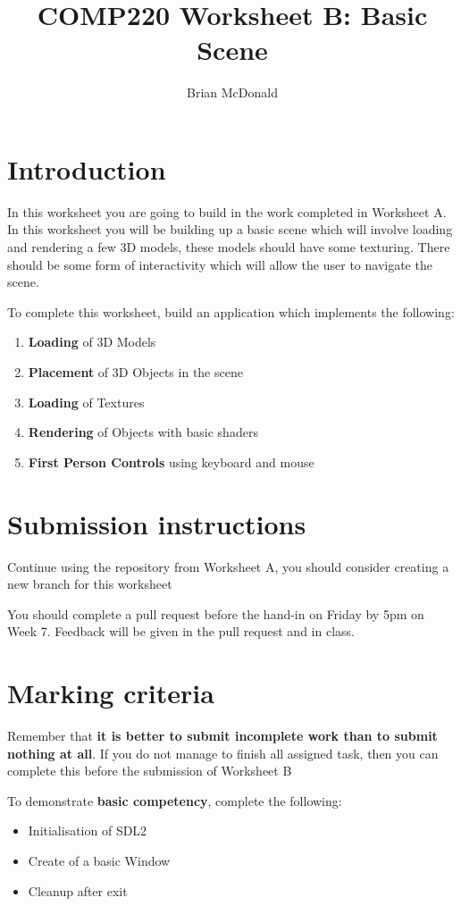 \documentclass{../../../fal_assignment}
\title{COMP220 Worksheet B: Basic Scene}
\author{Brian McDonald}
\begin{document}
\maketitle

\section*{Introduction}

In this worksheet you are going to build in the work completed in Worksheet A. In this worksheet you will be building up a basic scene which will involve loading and rendering a few 3D models, these models should have some texturing. There should be some form of interactivity which will allow the user to navigate the scene.

To complete this worksheet, build an application which implements the following:
\begin{enumerate}[label=(\alph*)]
	\item \textbf{Loading} of 3D Models
	\item \textbf{Placement} of 3D Objects in the scene
	\item \textbf{Loading} of Textures
	\item \textbf{Rendering} of Objects with basic shaders
	\item \textbf{First Person Controls} using keyboard and mouse
\end{enumerate}

\section*{Submission instructions}

Continue using the repository from Worksheet A, you should consider creating a new branch for this worksheet

You should complete a pull request before the hand-in on Friday by 5pm on Week 7. Feedback will be given in the pull request and in class.

\section*{Marking criteria}

Remember that \textbf{it is better to submit incomplete work than to submit nothing at all}. If you do not manage to finish all assigned task, then you can complete this before the submission of Worksheet B

To demonstrate \textbf{basic competency}, complete the following:
\begin{itemize}
	\item Initialisation of SDL2
	\item Create of a basic Window
	\item Cleanup after exit
\end{itemize} 
\end{document}
